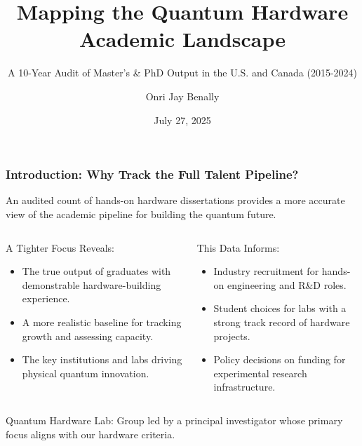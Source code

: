 \documentclass[aspectratio=169]{beamer}
\title[Quantum Hardware Academic Landscape]{Mapping the Quantum Hardware Academic Landscape}
\subtitle{A 10-Year Audit of Master's \& PhD Output in the U.S. and Canada (2015-2024)}
\author{Onri Jay Benally}
\institute{University of Minnesota–Twin Cities}
\date{July 27, 2025}
\begin{document}
\begin{frame}
    \titlepage
\end{frame}

\begin{frame}
    \frametitle{Introduction:  Why Track the Full Talent Pipeline?}
    An audited count of hands-on hardware dissertations provides a more accurate view of the academic pipeline for building the quantum future.
    
    \begin{columns}[T]
        \begin{column}{0.5\textwidth}
            \begin{block}{A Tighter Focus Reveals:}
                \begin{itemize}
                    \item The true output of graduates with demonstrable hardware-building experience.
                    \item A more realistic baseline for tracking growth and assessing capacity.
                    \item The key institutions and labs driving physical quantum innovation.
                \end{itemize}
            \end{block}
        \end{column}
        \begin{column}{0.5\textwidth}
            \begin{block}{This Data Informs:}
                \begin{itemize}
                    \item Industry recruitment for hands-on engineering and R\&D roles.
                    \item Student choices for labs with a strong track record of hardware projects.
                    \item Policy decisions on funding for experimental research infrastructure.
                \end{itemize}
            \end{block}
        \end{column}
    \end{columns}
    \vspace{1em}        
        Quantum Hardware Lab: Group led by a principal investigator whose primary focus aligns with our hardware criteria.
\end{frame}
\end{document}
